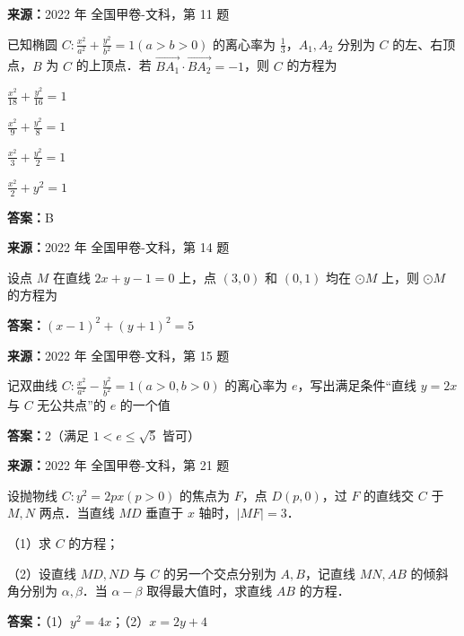 \begin{question}[points=5]
\textbf{来源：}2022 年 全国甲卷-文科，第 11 题\par
已知椭圆 $C:\frac{x^2}{a^2}+\frac{y^2}{b^2}=1(a>b>0)$ 的离心率为 $\frac{1}{3}$，$A_1,A_2$ 分别为 $C$ 的左、右顶点，$B$ 为 $C$ 的上顶点．若 $\overrightarrow{BA_1}\cdot\overrightarrow{BA_2}=-1$，则 $C$ 的方程为
\begin{choices}
  \item $\frac{x^2}{18}+\frac{y^2}{16}=1$
  \item $\frac{x^2}{9}+\frac{y^2}{8}=1$
  \item $\frac{x^2}{3}+\frac{y^2}{2}=1$
  \item $\frac{x^2}{2}+y^2=1$
\end{choices}
\begin{solution}
\textbf{答案：}B
\end{solution}
\end{question}

\begin{question}[points=5]
\textbf{来源：}2022 年 全国甲卷-文科，第 14 题\par
设点 $M$ 在直线 $2x+y-1=0$ 上，点 $(3,0)$ 和 $(0,1)$ 均在 $\odot M$ 上，则 $\odot M$ 的方程为
\fillin[{$(x-1)^2+(y+1)^2=5$}]
\begin{solution}
\textbf{答案：}$(x-1)^2+(y+1)^2=5$
\end{solution}
\end{question}

\begin{question}[points=5]
\textbf{来源：}2022 年 全国甲卷-文科，第 15 题\par
记双曲线 $C:\frac{x^2}{a^2}-\frac{y^2}{b^2}=1(a>0,b>0)$ 的离心率为 $e$，写出满足条件“直线 $y=2x$ 与 $C$ 无公共点”的 $e$ 的一个值
\begin{solution}
\textbf{答案：}$2$（满足 $1<e\leq\sqrt{5}$ 皆可）
\end{solution}
\end{question}

\begin{question}[points=12]
\textbf{来源：}2022 年 全国甲卷-文科，第 21 题\par
设抛物线 $C:y^2=2px(p>0)$ 的焦点为 $F$，点 $D(p,0)$，过 $F$ 的直线交 $C$ 于 $M,N$ 两点．当直线 $MD$ 垂直于 $x$ 轴时，$|MF|=3$．

（1）求 $C$ 的方程；

（2）设直线 $MD, ND$ 与 $C$ 的另一个交点分别为 $A,B$，记直线 $MN, AB$ 的倾斜角分别为 $\alpha, \beta$．当 $\alpha-\beta$ 取得最大值时，求直线 $AB$ 的方程．
\begin{solution}
\textbf{答案：}（1）$y^2=4x$；（2）$x=2y+4$
\end{solution}
\end{question}

